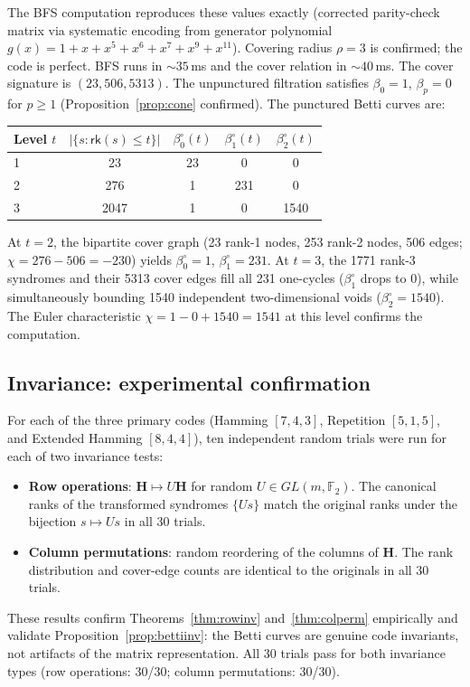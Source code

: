 \documentclass[11pt,twoside,leqno]{article}
\theoremstyle{definition}
\theoremstyle{plain}
\theoremstyle{remark}
\newcommand{\Ftwo}{\mathbb{F}_2}
\newcommand{\rk}{\mathsf{rk}}
\newcommand{\HH}{\mathbf{H}}
\newcommand{\covrad}{\rho}
\begin{document}
The BFS computation reproduces these values exactly (corrected parity-check matrix via
systematic encoding from generator polynomial $g(x)=1+x+x^5+x^6+x^7+x^9+x^{11}$).
Covering radius $\covrad=3$ is confirmed; the code is perfect.
BFS runs in $\sim35$\,ms and the cover relation in $\sim40$\,ms.
The cover signature is $(23, 506, 5313)$.
The unpunctured filtration satisfies $\beta_0=1$, $\beta_p=0$ for $p\ge 1$
(Proposition~\ref{prop:cone} confirmed). The punctured Betti curves are:
\begin{center}
\begin{tabular}{lcccc}
\toprule
Level $t$ & $|\{s:\rk(s)\le t\}|$ & $\beta_0^\circ(t)$ & $\beta_1^\circ(t)$ & $\beta_2^\circ(t)$ \\
\midrule
1 & 23 & 23 & 0 & 0 \\
2 & 276 & 1 & 231 & 0 \\
3 & 2047 & 1 & 0 & 1540 \\
\bottomrule
\end{tabular}
\end{center}
At $t=2$, the bipartite cover graph (23 rank-1 nodes, 253 rank-2 nodes, 506 edges;
$\chi = 276-506=-230$) yields $\beta_0^\circ=1$, $\beta_1^\circ=231$.
At $t=3$, the 1771 rank-3 syndromes and their 5313 cover edges fill all 231 one-cycles
($\beta_1^\circ$ drops to 0), while simultaneously bounding 1540 independent two-dimensional
voids ($\beta_2^\circ=1540$). The Euler characteristic $\chi=1-0+1540=1541$ at this level
confirms the computation.

\subsection{Invariance: experimental confirmation}\label{sec:res:invariance}

For each of the three primary codes (Hamming $[7,4,3]$, Repetition $[5,1,5]$, and Extended
Hamming $[8,4,4]$), ten independent random trials were run for each of two invariance tests:
\begin{itemize}[itemsep=1pt]
  \item \textbf{Row operations}: $\HH\mapsto U\HH$ for random $U\in GL(m,\Ftwo)$. The canonical
    ranks of the transformed syndromes $\{Us\}$ match the original ranks under the bijection
    $s\mapsto Us$ in all 30 trials.
  \item \textbf{Column permutations}: random reordering of the columns of $\HH$. The rank
    distribution and cover-edge counts are identical to the originals in all 30 trials.
\end{itemize}
These results confirm Theorems~\ref{thm:rowinv} and~\ref{thm:colperm} empirically and validate
Proposition~\ref{prop:bettiinv}: the Betti curves are genuine code invariants, not artifacts of
the matrix representation.
All 30 trials pass for both invariance types (row operations: 30/30; column permutations: 30/30).
\end{document}
